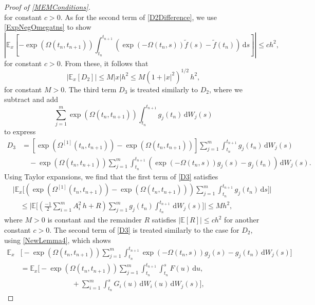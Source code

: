 \documentclass[onefignum]{siamart250211}
\providecommand{\abs}[1]{\left|#1\right|}
\begin{document}
\begin{proof}[Proof of \cref{MEMConditions}]
\begin{equation*}
\end{equation*}
for constant $c>0$. As for the second term of \cref{D2Difference}, we use \cref{ExpNegOmegatns} to show
\[\abs{\mathbb{E}_x\left[-\exp(\Omega(t_n,t_{n+1}))\int_{t_n}^{t_{n+1}}\left(\exp(-\Omega(t_n,s))\tilde{f}(s)-\tilde{f}(t_n)\right)\,\mathrm{d}s\right]}\leqslant ch^2,\]
for constant $c>0$. From these, it follows that
\begin{equation}\abs{\mathbb{E}_x[D_2]}\leqslant M\abs{x}h^2\leqslant M\left(1+\abs{x}^2\right)^{1/2}\,h^2,\label{D2WeakMEM}\end{equation}
for constant $M>0$. The third term $D_3$ is treated similarly to $D_2$, where we subtract and add
\[\sum_{j=1}^m\exp(\Omega(t_n,t_{n+1}))\int_{t_n}^{t_{n+1}}g_j(t_n)\,\mathrm{d}W_j(s)\]
to express
\begin{align}
D_3&=\left[\exp\left(\Omega^{[1]}(t_n,t_{n+1})\right)-\exp(\Omega(t_n,t_{n+1}))\right]\sum_{j=1}^m\int_{t_n}^{t_{n+1}}g_j(t_n)\,\mathrm{d}W_j(s)\nonumber\\
&\quad-\exp(\Omega(t_n,t_{n+1}))\sum_{j=1}^m\int_{t_n}^{t_{n+1}}\left(\exp(-\Omega(t_n,s))g_j(s)-g_j(t_n)\right)\,\mathrm{d}W_j(s).\label{D3}
\end{align}
Using Taylor expansions, we find that the first term of \cref{D3} satisfies
\begin{align*}
&\bigg|\mathbb{E}_x\bigg[\left(\exp\left(\Omega^{[1]}(t_n,t_{n+1})\right)-\exp(\Omega(t_n,t_{n+1}))\right)\sum_{j=1}^m\int_{t_n}^{t_{n+1}}g_j(t_n)\,\mathrm{d}s\bigg]\bigg|\\
&\quad\leqslant\bigg|\mathbb{E}\bigg[\left(\frac{-1}{2}\sum_{i=1}^mA_i^2\,h+R\right)\sum_{j=1}^mg_j(t_n)\int_{t_n}^{t_{n+1}}\,\mathrm{d}W_j(s)\bigg]\bigg|\leqslant Mh^2,
\end{align*}
where $M>0$ is constant and the remainder $R$ satisfies $\abs{\mathbb{E}[R]}\leqslant ch^2$ for another constant $c>0$. The second term of \cref{D3} is treated similarly to the case for $D_2$, using \cref{NewLemma4}, which shows
\begin{align}
\mathbb{E}_x&\bigg[-\exp(\Omega(t_n,t_{n+1}))\sum_{j=1}^m\int_{t_n}^{t_{n+1}}\exp(-\Omega(t_n,s))g_j(s)-g_j(t_n)\,\mathrm{d}W_j(s)\bigg]\nonumber\\
&=\mathbb{E}_x\bigg[-\exp(\Omega(t_n,t_{n+1}))\sum_{j=1}^m\int_{t_n}^{t_{n+1}}\int_{t_n}^sF(u)\,\mathrm{d}u,\label{BAA}\\
&\hspace{3cm}+\sum_{i=1}^m\int_{t_n}^sG_i(u)\,\mathrm{d}W_i(u)\,\mathrm{d}W_j(s)\bigg],\nonumber
\end{align}

\end{proof}
\end{document}
